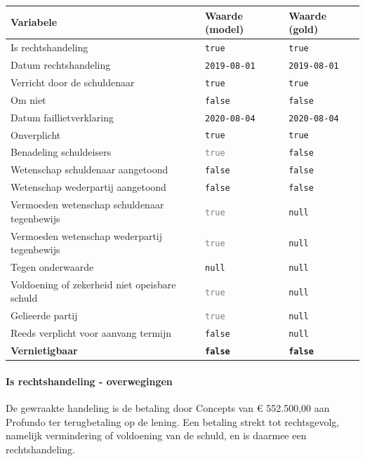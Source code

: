 \documentclass[
  dutch,
  a4paper,
]{article}
\begin{document}
\begin{center}
\small
\begin{tabular}{@{}p{7.4cm}p{2.6cm}p{2.6cm}@{}}
\toprule
Variabele & Waarde (model) & Waarde (gold) \\
\midrule
Is rechtshandeling & \texttt{true} & \texttt{true} \\
Datum rechtshandeling & \texttt{2019-08-01} & \texttt{2019-08-01} \\
Verricht door de schuldenaar & \texttt{true} & \texttt{true} \\
Om niet & \texttt{false} & \texttt{false} \\
Datum faillietverklaring & \texttt{2020-08-04} & \texttt{2020-08-04} \\
Onverplicht & \texttt{true} & \texttt{true} \\
Benadeling schuldeisers & \textcolor{gray}{\texttt{true}} & \texttt{false} \\
Wetenschap schuldenaar aangetoond & \texttt{false} & \texttt{false} \\
Wetenschap wederpartij aangetoond & \texttt{false} & \texttt{false} \\
Vermoeden wetenschap schuldenaar tegenbewijs & \textcolor{gray}{\texttt{true}} & \texttt{null} \\
Vermoeden wetenschap wederpartij tegenbewijs & \textcolor{gray}{\texttt{true}} & \texttt{null} \\
Tegen onderwaarde & \texttt{null} & \texttt{null} \\
Voldoening of zekerheid niet opeisbare schuld & \textcolor{gray}{\texttt{true}} & \texttt{null} \\
Gelieerde partij & \textcolor{gray}{\texttt{true}} & \texttt{null} \\
Reeds verplicht voor aanvang termijn & \texttt{false} & \texttt{null} \\
\textbf{Vernietigbaar} & \textbf{\texttt{false}} & \textbf{\texttt{false}} \\
\bottomrule
\end{tabular}
\end{center}

\paragraph{Is rechtshandeling - overwegingen}\label{is-rechtshandeling---overwegingen-43}

De gewraakte handeling is de betaling door Concepts van € 552.500,00 aan Profundo ter terugbetaling op de lening. Een betaling strekt tot rechtsgevolg, namelijk vermindering of voldoening van de schuld, en is daarmee een rechtshandeling.
\end{document}
